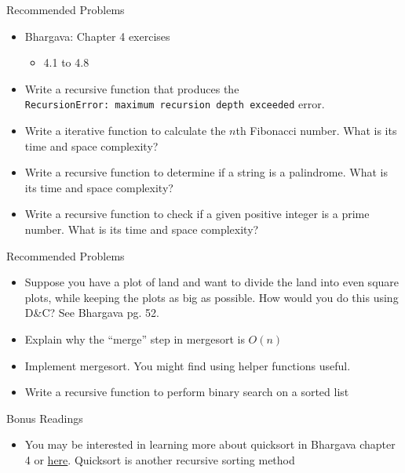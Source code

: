 \documentclass[
  ignorenonframetext,
]{beamer}
\providecommand{\tightlist}{%
  \setlength{\itemsep}{0pt}\setlength{\parskip}{0pt}}\usepackage{longtable,booktabs,array}
\begin{document}
\begin{frame}[fragile]{Recommended Problems}
\protect\hypertarget{recommended-problems}{}
\begin{itemize}
\item
  Bhargava: Chapter 4 exercises

  \begin{itemize}
  \tightlist
  \item
    4.1 to 4.8
  \end{itemize}
\item
  Write a recursive function that produces the
  \texttt{RecursionError:\ maximum\ recursion\ depth\ exceeded} error.
\item
  Write a iterative function to calculate the \(n\)th Fibonacci number.
  What is its time and space complexity?
\item
  Write a recursive function to determine if a string is a palindrome.
  What is its time and space complexity?
\item
  Write a recursive function to check if a given positive integer is a
  prime number. What is its time and space complexity?
\end{itemize}
\end{frame}

\begin{frame}{Recommended Problems}
\protect\hypertarget{recommended-problems-1}{}
\begin{itemize}
\item
  Suppose you have a plot of land and want to divide the land into even
  square plots, while keeping the plots as big as possible. How would
  you do this using D\&C? See Bhargava pg. 52.
\item
  Explain why the ``merge'' step in mergesort is \(O(n)\)
\item
  Implement mergesort. You might find using helper functions useful.
\item
  Write a recursive function to perform binary search on a sorted list
\end{itemize}
\end{frame}

\begin{frame}{Bonus Readings}
\protect\hypertarget{bonus-readings}{}
\begin{itemize}
\tightlist
\item
  You may be interested in learning more about quicksort in Bhargava
  chapter 4 or
  \href{https://www.teach.cs.toronto.edu/~csc148h/winter/notes/recursive-sorting/recursive_sorting.html}{here}.
  Quicksort is another recursive sorting method
\end{itemize}
\end{frame}
\end{document}
